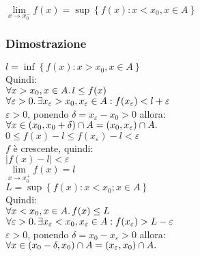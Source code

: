 \documentclass[a4paper, twoside, italian, 11pt]{book}
\newcommand{\braces}[1] {\left \{ #1 \right \}}
\newcommand{\abs}[1] {\left | #1 \right |}
\begin{document}
$\lim\limits_{x \to x_0^-} f(x) = \sup \braces{f(x) : x < x_0, x \in A}$


\subsubsection{Dimostrazione}

\noindent
$l = \inf \braces{f(x) : x > x_0, x \in A}$ \\

\noindent
Quindi: \\

\noindent
$\forall x > x_0, x \in A \ldotp l \leq f(x)$ \\

\noindent
$\forall \varepsilon > 0 \ldotp \exists x_\varepsilon > x_0, x_\varepsilon \in A : f(x_\varepsilon) < l + \varepsilon$ \\

\noindent
$\varepsilon > 0$, ponendo $\delta = x_\varepsilon - x_0 > 0$ allora: \\

\noindent
$\forall x \in (x_0, x_0 + \delta) \cap A = (x_0, x_\varepsilon) \cap A \ldotp$ \\

$0 \leq f(x) - l \leq f(x_\varepsilon) - l < \varepsilon$ \\

\noindent
$f$ è crescente, quindi: \\

$\abs{f(x) - l} < \varepsilon$ \\

$\lim\limits_{x \to x_0^+} f(x) = l$ \\

\noindent
$L = \sup \braces{f(x) : x < x_0; x \in A}$ \\

\noindent
Quindi: \\

$\forall x < x_0, x \in A \ldotp f(x) \leq L$ \\

$\forall \varepsilon > 0 \ldotp \exists x_\varepsilon < x_0, x_\varepsilon \in A : f(x_\varepsilon) > L - \varepsilon$ \\

\noindent
$\varepsilon > 0$, ponendo $\delta = x_0 - x_\varepsilon > 0$ allora: \\

\noindent
$\forall x \in (x_0 - \delta, x_0) \cap A = (x_\varepsilon, x_0) \cap A \ldotp$ \\
\end{document}
